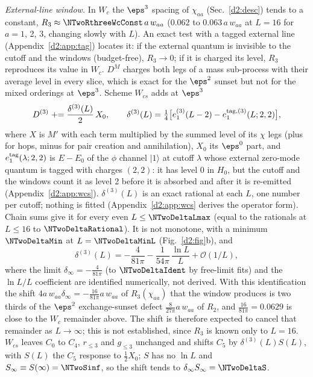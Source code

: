 \emph{External-line window.} In $W_c$ the $\eps^3$ spacing of $\chi_{aa}$ (Sec.~\ref{d2:desc}) tends to a constant,
$R_3\approx\NTwoRthreeWcConst\,a\,w_{aa}$ ($0.062$ to $0.063\,a\,w_{aa}$ at $L=16$ for $a=1$, 2, 3, changing slowly with $L$). An exact test with a tagged external line (Appendix~\ref{d2:app:tag}) locates it: if the external quantum is
invisible to the cutoff and the windows (budget-free), $R_3\to0$; if it is charged its level, $R_3$ reproduces its value
in $W_c$. $D^M$
charges both legs of a mass sub-process with their average level in every slice, which is exact for the $\eps^2$ sunset but not
for the mixed orderings at $\eps^3$. Scheme $W_{cs}$ adds at $\eps^3$
\begin{equation}
 D^{(3)}\mathrel{+}=\frac{\delta^{(3)}(L)}2\,X_0,\qquad \delta^{(3)}(L)=\tfrac14\big[e_1^{(3)}(L-2)-e_1^{{\rm tag},(3)}(L;2,2)\big] ,
 \label{d2:eq:wcs}
\end{equation}
where $X$ is $M'$ with each term multiplied by the summed level of its $\chi$ legs (plus for hops, minus for pair
creation and annihilation), $X_0$ its $\eps^0$ part, and $e_1^{\rm tag}(\lambda;2,2)$ is $E-E_0$ of the $\phi$ channel $|1\rangle$
at cutoff $\lambda$ whose external zero-mode quantum is tagged with charges $(2,2)$: it has level 0 in $H_0$, but the cutoff
and the windows count it as level 2 before it is absorbed and after it is re-emitted (Appendix~\ref{d2:app:wcs}). $\delta^{(3)}(L)$ is an exact rational at each $L$, one number per cutoff; nothing is
fitted (Appendix~\ref{d2:app:wcs} derives the operator form). Chain sums give it for every even $L\le\NTwoDeltaLmax$ (equal to the rationals at $L\le16$ to $\NTwoDeltaRational$).
It is not monotone, with a minimum $\NTwoDeltaMin$ at $L=\NTwoDeltaMinL$ (Fig.~\ref{d2:fig}b), and
\begin{equation}
 \delta^{(3)}(L)=-\frac4{81\pi}-\frac1{54\pi}\,\frac{\ln L}L+\mathcal O(1/L) ,
 \label{d2:eq:delta}
\end{equation}
where the limit $\delta_\infty=-\frac4{81\pi}$ (to $\NTwoDeltaIdent$ by free-limit fits) and the $\ln L/L$ coefficient are
identified numerically, not derived. With this identification the shift $4a\,w_{aa}\delta_\infty=-\frac{16}{81\pi}a\,w_{aa}$
of $R_3(\chi_{aa})$ that the window produces is two thirds of the $\eps^2$ exchange-sunset defect $\frac{8}{27\pi}a\,w_{aa}$
of $R_2$, and $\frac{16}{81\pi}=0.0629$ is close to the $W_c$ remainder above. The shift is therefore expected to cancel
that remainder as $L\to\infty$; this is not established, since $R_3$ is known only to $L=16$. $W_{cs}$ leaves $C_0$ to
$C_4$, $r_{\le3}$ and $g_{\le3}$ unchanged and shifts $C_5$ by $\delta^{(3)}(L)S(L)$, with $S(L)$ the $C_5$ response to
$\frac12X_0$; $S$ has no $\ln L$ and $S_\infty\equiv S(\infty)=\NTwoSinf$, so the shift tends to
$\delta_\infty S_\infty=\NTwoDeltaS$.

